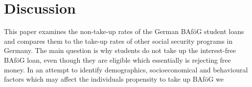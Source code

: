 \section{Discussion}
%
%
This paper examines the non-take-up rates of the German BAföG student loans and compares them to the take-up rates of other social security programs in Germany.
The main question is why students do not take up the interest-free BAföG loan, even though they are eligible which essentially is rejecting free money. 
In an attempt to identify demographics, socioeconomical and behavioural factors which may affect the individuals propensity to take up BAföG we 


%
%

%
%

%
%

%
%

%
%

%
%
